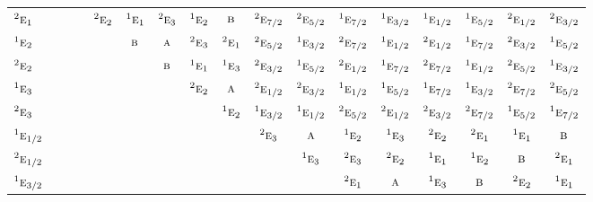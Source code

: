 \documentclass[10pt,a4paper]{article}
\numberwithin{equation}{section}
\newcommand{\irr}[1]{\text{\normalfont\scshape #1}}
\newcommand{\conjpair}[1]{{}^{#1}}
\begin{document}
{\begin{longtable}{@{}lcccccccccccccccc@{}}
$\conjpair{2}\irr{e}_{1}$ &  &  &  & $\conjpair{2}\irr{e}_{2}$ & $\conjpair{1}\irr{e}_{1}$ & $\conjpair{2}\irr{e}_{3}$ & $\conjpair{1}\irr{e}_{2}$ & $\irr{b}$ & $\conjpair{2}\irr{e}_{7/2}$ & $\conjpair{2}\irr{e}_{5/2}$ & $\conjpair{1}\irr{e}_{7/2}$ & $\conjpair{1}\irr{e}_{3/2}$ & $\conjpair{1}\irr{e}_{1/2}$ & $\conjpair{1}\irr{e}_{5/2}$ & $\conjpair{2}\irr{e}_{1/2}$ & $\conjpair{2}\irr{e}_{3/2}$\\
$\conjpair{1}\irr{e}_{2}$ &  &  &  &  & $\irr{b}$ & $\irr{a}$ & $\conjpair{2}\irr{e}_{3}$ & $\conjpair{2}\irr{e}_{1}$ & $\conjpair{2}\irr{e}_{5/2}$ & $\conjpair{1}\irr{e}_{3/2}$ & $\conjpair{2}\irr{e}_{7/2}$ & $\conjpair{1}\irr{e}_{1/2}$ & $\conjpair{2}\irr{e}_{1/2}$ & $\conjpair{1}\irr{e}_{7/2}$ & $\conjpair{2}\irr{e}_{3/2}$ & $\conjpair{1}\irr{e}_{5/2}$\\
$\conjpair{2}\irr{e}_{2}$ &  &  &  &  &  & $\irr{b}$ & $\conjpair{1}\irr{e}_{1}$ & $\conjpair{1}\irr{e}_{3}$ & $\conjpair{2}\irr{e}_{3/2}$ & $\conjpair{1}\irr{e}_{5/2}$ & $\conjpair{2}\irr{e}_{1/2}$ & $\conjpair{1}\irr{e}_{7/2}$ & $\conjpair{2}\irr{e}_{7/2}$ & $\conjpair{1}\irr{e}_{1/2}$ & $\conjpair{2}\irr{e}_{5/2}$ & $\conjpair{1}\irr{e}_{3/2}$\\
$\conjpair{1}\irr{e}_{3}$ &  &  &  &  &  &  & $\conjpair{2}\irr{e}_{2}$ & $\irr{a}$ & $\conjpair{2}\irr{e}_{1/2}$ & $\conjpair{2}\irr{e}_{3/2}$ & $\conjpair{1}\irr{e}_{1/2}$ & $\conjpair{1}\irr{e}_{5/2}$ & $\conjpair{1}\irr{e}_{7/2}$ & $\conjpair{1}\irr{e}_{3/2}$ & $\conjpair{2}\irr{e}_{7/2}$ & $\conjpair{2}\irr{e}_{5/2}$\\
$\conjpair{2}\irr{e}_{3}$ &  &  &  &  &  &  &  & $\conjpair{1}\irr{e}_{2}$ & $\conjpair{1}\irr{e}_{3/2}$ & $\conjpair{1}\irr{e}_{1/2}$ & $\conjpair{2}\irr{e}_{5/2}$ & $\conjpair{2}\irr{e}_{1/2}$ & $\conjpair{2}\irr{e}_{3/2}$ & $\conjpair{2}\irr{e}_{7/2}$ & $\conjpair{1}\irr{e}_{5/2}$ & $\conjpair{1}\irr{e}_{7/2}$\\
$\conjpair{1}\irr{e}_{1/2}$ &  &  &  &  &  &  &  &  & $\conjpair{2}\irr{e}_{3}$ & $\irr{a}$ & $\conjpair{1}\irr{e}_{2}$ & $\conjpair{1}\irr{e}_{3}$ & $\conjpair{2}\irr{e}_{2}$ & $\conjpair{2}\irr{e}_{1}$ & $\conjpair{1}\irr{e}_{1}$ & $\irr{b}$\\
$\conjpair{2}\irr{e}_{1/2}$ &  &  &  &  &  &  &  &  &  & $\conjpair{1}\irr{e}_{3}$ & $\conjpair{2}\irr{e}_{3}$ & $\conjpair{2}\irr{e}_{2}$ & $\conjpair{1}\irr{e}_{1}$ & $\conjpair{1}\irr{e}_{2}$ & $\irr{b}$ & $\conjpair{2}\irr{e}_{1}$\\
$\conjpair{1}\irr{e}_{3/2}$ &  &  &  &  &  &  &  &  &  &  & $\conjpair{2}\irr{e}_{1}$ & $\irr{a}$ & $\conjpair{1}\irr{e}_{3}$ & $\irr{b}$ & $\conjpair{2}\irr{e}_{2}$ & $\conjpair{1}\irr{e}_{1}$\\

\end{longtable}}
\end{document}
